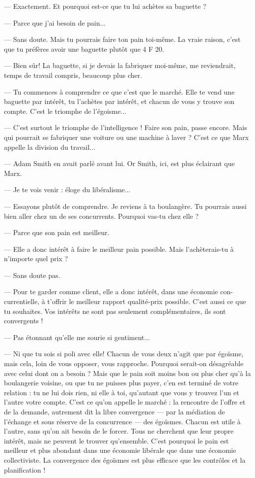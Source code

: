 — Exactement. Et pourquoi est-ce que tu lui achètes sa baguette ?

— Parce que j’ai besoin de pain...

— Sans doute. Mais tu pourrais faire ton pain toi-même. La vraie raison,
c’est que tu préfères avoir une baguette plutôt que 4 F 20.

— Bien sûr! La baguette, si je devais la fabriquer moi-même, me reviendrait,
temps de travail compris, beaucoup plus cher.

— Tu commences à comprendre ce que c’est que le marché. Elle te vend
une baguette par intérêt, tu l’achètes par intérêt, et chacun de vous y trouve son
compte. C’est le triomphe de l’égoisme...

— C’est surtout le triomphe de l'intelligence ! Faire son pain, passe encore.
Mais qui pourrait se fabriquer une voiture ou une machine à laver ? C’est ce
que Marx appelle la division du travail...

— Adam Smith en avait parlé avant lui. Or Smith, ici, est plus éclairant que
Marx.

— Je te vois venir : éloge du libéralisme...

— Essayons plutôt de comprendre. Je reviens à ta boulangère. Tu pourrais
aussi bien aller chez un de ses concurrents. Pourquoi vas-tu chez elle ?

— Parce que son pain est meilleur.

— Elle a donc intérêt à faire le meilleur pain possible. Mais l’achèterais-tu à
n'importe quel prix ?

— Sans doute pas.

— Pour te garder comme client, elle a donc intérêt, dans une économie con-
currentielle, à t'offrir le meilleur rapport qualité-prix possible. C’est aussi ce
que tu souhaites. Vos intérêts ne sont pas seulement complémentaires, ils sont
convergents !

— Pas étonnant qu’elle me sourie si gentiment...

— Ni que tu sois si poli avec elle! Chacun de vous deux n’agit que par
égoïsme, mais cela, loin de vous opposer, vous rapproche. Pourquoi serait-on
désagréable avec celui dont on a besoin ? Mais que le pain soit moins bon ou
plus cher qu’à la boulangerie voisine, ou que tu ne puisses plus payer, c'en est
terminé de votre relation : tu ne lui dois rien, ni elle à toi, qu’autant que vous
y trouvez l’un et l’autre votre compte. C’est ce qu’on appelle le marché : la rencontre
de l’offre et de la demande, autrement dit la libre convergence — par la
médiation de l'échange et sous réserve de la concurrence — des égoïsmes.
Chacun est utile à l’autre, sans qu’on ait besoin de le forcer. Tous ne cherchent
que leur propre intérêt, mais ne peuvent le trouver qu’ensemble. C’est pourquoi
le pain est meilleur et plus abondant dans une économie libérale que dans
une économie collectiviste. La convergence des égoïsmes est plus efficace que
les contrôles et la planification !

